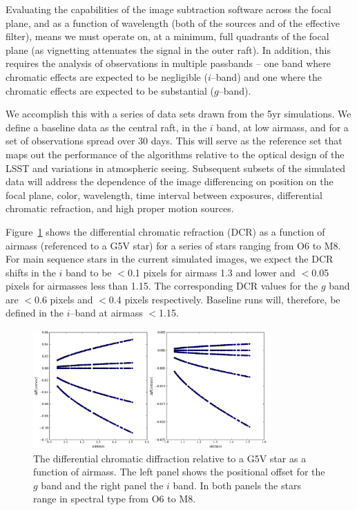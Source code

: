 \documentclass[prd, nofootinbib, floatfix, 11pt,tightenlines,times]{article}
\begin{document}
Evaluating the capabilities of the image subtraction software across
the focal plane, and as a function of wavelength (both of the sources
and of the effective filter),  means we must operate on, at a minimum,
full quadrants of the focal plane (as vignetting attenuates the signal
in the outer raft).  In addition, this requires the analysis of observations in multiple
passbands -- one band where chromatic effects are expected to be
negligible ($i$--band) and one where the chromatic effects are
expected to be substantial ($g$--band).

We accomplish this with a series of data sets drawn from the 5yr
simulations. We define a baseline data as the central raft, in the $i$
band, at low airmass, and for a set of observations spread
over 30 days.  This will serve as the reference set that maps out the
performance of the algorithms relative to the optical design of the
LSST and variations in atmospheric seeing. Subsequent subsets of the
simulated data will address the dependence of the image differencing
on position on the focal plane, color, wavelength, time interval
between exposures, differential chromatic refraction, and high proper
motion sources. 

Figure~\ref{DCR} shows the differential chromatic refraction (DCR) as
a function of airmass (referenced to a G5V star) for a series of stars
ranging from O6 to M8. For main sequence stars in the current
simulated images, we expect the DCR shifts in the $i$ band to be
$<$0.1 pixels for airmass 1.3 and lower and $<$0.05 pixels for
airmasses less than 1.15. The corresponding DCR values for the $g$
band are $<$0.6 pixels and $<$0.4 pixels respectively. Baseline runs
will, therefore, be defined in the $i$--band at airmass $<$1.15.

\begin{figure}
\centerline{\includegraphics[width=0.8\textwidth]{Figures/DCR_R_stars.eps}}
\caption{The differential chromatic diffraction relative to a G5V star
  as a function of airmass. The left panel shows the positional offset
  for the $g$ band and the right panel the $i$ band. In both panels
  the stars range in spectral type from O6 to M8.}
\label{DCR}
\end{figure}
\end{document}

